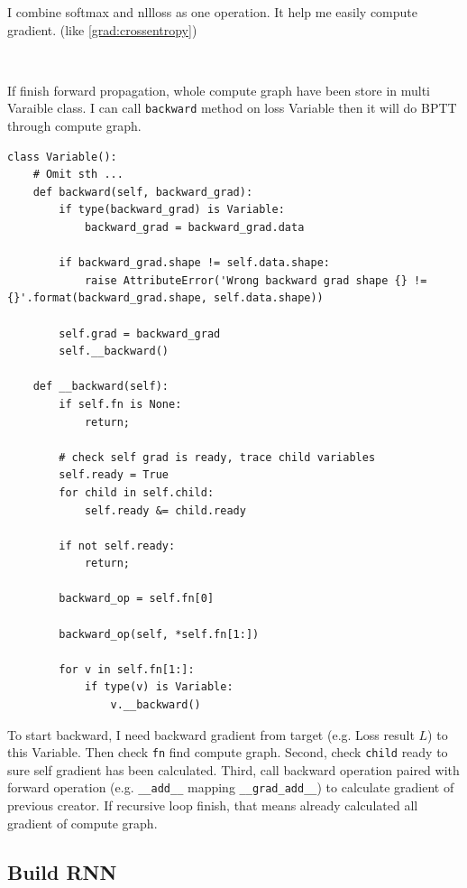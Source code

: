 \documentclass[12pt]{article}
\begin{document}
I combine softmax and nllloss as one operation. It help me easily compute gradient. (like \ref{grad:crossentropy})
\par \ \par

If finish forward propagation, whole compute graph have been store in multi Varaible class. I can call \verb|backward| method on loss Variable then it will do BPTT through compute graph.

\begin{verbatim}
class Variable():
    # Omit sth ...
    def backward(self, backward_grad):
        if type(backward_grad) is Variable:
            backward_grad = backward_grad.data
        
        if backward_grad.shape != self.data.shape:
            raise AttributeError('Wrong backward grad shape {} != {}'.format(backward_grad.shape, self.data.shape))
        
        self.grad = backward_grad
        self.__backward()
    
    def __backward(self):
        if self.fn is None:
            return;
        
        # check self grad is ready, trace child variables
        self.ready = True
        for child in self.child:
            self.ready &= child.ready
        
        if not self.ready:
            return;
        
        backward_op = self.fn[0]
        
        backward_op(self, *self.fn[1:])
        
        for v in self.fn[1:]:
            if type(v) is Variable:
                v.__backward()
\end{verbatim}

To start backward, I need backward gradient from target (e.g. Loss result $L$) to this Variable. Then check \verb|fn| find compute graph. Second, check \verb|child| ready to sure self gradient has been calculated. Third, call backward operation paired with forward operation (e.g. \verb|__add__| mapping \verb|__grad_add__|) to calculate gradient of previous creator. If recursive loop finish, that means already calculated all gradient of compute graph.

\subsection{Build RNN}
\end{document}
